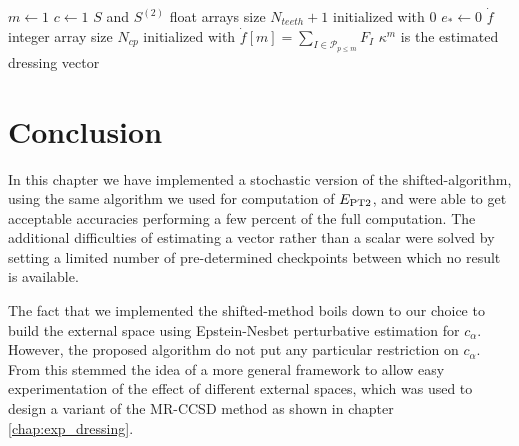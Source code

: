 \documentclass[./thesis.tex]{subfiles}
\begin{document}
\begin{algorithm}
	$m \gets 1$ \;
	$c \gets 1$ \;
	$S$ and $S^{(2)}$ float arrays size $N_{teeth}+1$ initialized with $0$ \;
	$e_* \gets 0$ \;
	$\dot f$ integer array size $N_{cp}$ initialized with $\dot f[m] = \sum_{I \in \mathcal{P}_{p\leq m}} F_{I}$ \;
	$\kappa^m$ is the estimated dressing vector \;
	
\end{algorithm}


\section{Conclusion}

In this chapter we have implemented a stochastic version of the shifted-\Bk algorithm, using the same algorithm we used for computation of $E_\text{PT2}$, and were able to get acceptable accuracies performing a few percent of the full computation.
The additional difficulties of estimating a vector rather than a scalar were solved by setting a limited number of pre-determined checkpoints between which no result is available.

The fact that we implemented the shifted-\Bk method boils down to our choice to build the external space using Epstein-Nesbet perturbative estimation for $c_\alpha$. However, the proposed algorithm do not put any particular restriction on $c_\alpha$. From this stemmed the idea of a more general framework to allow easy experimentation of the effect of different external spaces, which was used to design a \alert{variant} of the MR-CCSD method as shown in chapter \ref{chap:exp_dressing}.
\end{document}
